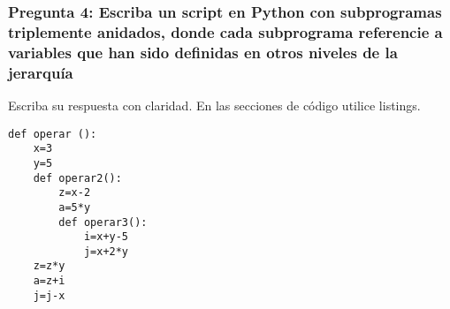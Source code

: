 \subsubsection{Pregunta 4: Escriba un script en Python con subprogramas triplemente anidados, donde cada subprograma referencie a variables que han sido definidas en otros niveles de la jerarquía}

Escriba su respuesta con claridad. En las secciones de código utilice listings.

\lstset{language = Python} 
\begin{lstlisting}[frame = single] %Comienzo del Código
def operar ():
	x=3
	y=5
	def operar2():
		z=x-2
		a=5*y
		def operar3():
			i=x+y-5
			j=x+2*y	
	z=z*y
	a=z+i
	j=j-x
\end{lstlisting}
